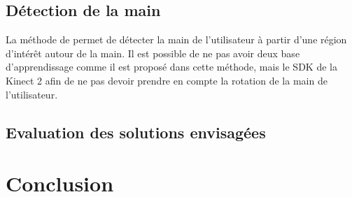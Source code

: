 \documentclass{article}
\begin{document}
\subsection{Détection de la main}
La méthode de \cite{export:238453} permet de détecter la main de l'utilisateur à partir d'une
région d'intérêt autour de la main. Il est possible de ne pas avoir deux base d'apprendissage comme
il est proposé dans cette méthode, mais le SDK de la Kinect 2 afin de ne pas devoir prendre en 
compte la rotation de la main de l'utilisateur.



\subsection{Evaluation des solutions envisagées}

\newpage




\section{Conclusion}

\newpage





\end{document}
